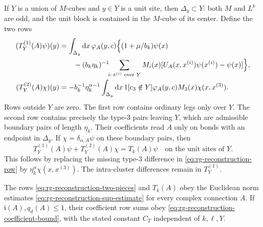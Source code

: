 If $Y$ is a union of $M$-cubes and $y\in Y$ is a unit site,
then $\Delta_y\subset Y$: both $M$ and $L^k$ are odd, and the
unit block is contained in the $M$-cube of its center.
Define the two rows
\begin{equation}\label{eq:rg-reconstruction-two-pieces}
 \begin{split}
 (T_Y^{(1)}(A)\psi)(y)
 &=\int_{\Delta_y}\mathrm d x\,\varphi_A(y,c)
    \Bigl\{(1+\mu/b_k)\psi(x)\\
 &\qquad-(b_k\eta_k)^{-1}\!\!\sum_{i:\,x^{(i)}\text{ over }Y}
           M_i(x)[U_A(x,x^{(i)})\psi(x^{(i)})-\psi(x)]\Bigr\},\\
 (T_Y^{(2)}(A)\chi)(y)
 &=-b_k^{-1}\eta_k^{\alpha-1}\int_{\Delta_y}\mathrm d x\,
                1[c_3\notin Y]\varphi_A(y,c)M_3(x)\chi(x,x^{(3)}).
 \end{split}
\end{equation}
Rows outside $Y$ are zero. The first row contains ordinary
legs only over $Y$. The second row contains precisely the
type-$3$ pairs leaving $Y$, which are admissible boundary
pairs of length $\eta_k$. Their coefficients read $A$ only
on bonds with an endpoint in $\Delta_y$.
If $\chi=\delta_{\alpha,A}\psi$ on these boundary pairs, then
\begin{equation}\label{eq:rg-reconstruction-local-identity}
 T_Y^{(1)}(A)\psi+T_Y^{(2)}(A)\chi=T_k(A)\psi
                                             \quad\text{on the unit sites of }Y.
\end{equation}
This follows by replacing the missing type-$3$ difference in
\eqref{eq:rg-reconstruction-row} by
$\eta_k^\alpha\chi(x,x^{(3)})$.
The intra-cluster differences remain in $T_Y^{(1)}$.

\begin{proposition}\label{prop:rg-reconstruction-estimate}
The rows \eqref{eq:rg-reconstruction-two-pieces} and $T_k(A)$
obey the Euclidean norm estimates
\eqref{eq:rg-reconstruction-sup-estimate} for every complex
connection $A$. If $\mathfrak i(A),q_d(A)\le1$, their coefficient
row sums obey \eqref{eq:rg-reconstruction-coefficient-bound},
with the stated constant $C_T$ independent of $k,\ell,Y$.
\end{proposition}

